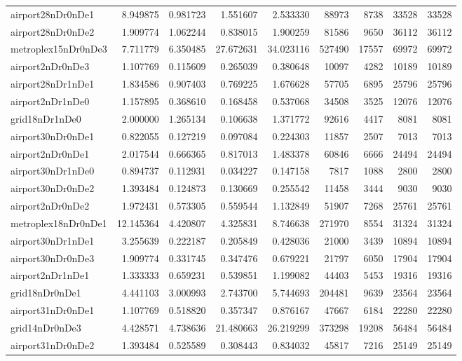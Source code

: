 \begin{longtable}{|l|r|r|r|r|r|r|r|r|}
airport28nDr0nDe1 & 8.949875 & 0.981723 & 1.551607 & 2.533330 & 88973 & 8738 & 33528 & 33528 \\
airport28nDr0nDe2 & 1.909774 & 1.062244 & 0.838015 & 1.900259 & 81586 & 9650 & 36112 & 36112 \\
metroplex15nDr0nDe3 & 7.711779 & 6.350485 & 27.672631 & 34.023116 & 527490 & 17557 & 69972 & 69972 \\
airport2nDr0nDe3 & 1.107769 & 0.115609 & 0.265039 & 0.380648 & 10097 & 4282 & 10189 & 10189 \\
airport28nDr1nDe1 & 1.834586 & 0.907403 & 0.769225 & 1.676628 & 57705 & 6895 & 25796 & 25796 \\
airport2nDr1nDe0 & 1.157895 & 0.368610 & 0.168458 & 0.537068 & 34508 & 3525 & 12076 & 12076 \\
grid18nDr1nDe0 & 2.000000 & 1.265134 & 0.106638 & 1.371772 & 92616 & 4417 & 8081 & 8081 \\
airport30nDr0nDe1 & 0.822055 & 0.127219 & 0.097084 & 0.224303 & 11857 & 2507 & 7013 & 7013 \\
airport2nDr0nDe1 & 2.017544 & 0.666365 & 0.817013 & 1.483378 & 60846 & 6666 & 24494 & 24494 \\
airport30nDr1nDe0 & 0.894737 & 0.112931 & 0.034227 & 0.147158 & 7817 & 1088 & 2800 & 2800 \\
airport30nDr0nDe2 & 1.393484 & 0.124873 & 0.130669 & 0.255542 & 11458 & 3444 & 9030 & 9030 \\
airport2nDr0nDe2 & 1.972431 & 0.573305 & 0.559544 & 1.132849 & 51907 & 7268 & 25761 & 25761 \\
metroplex18nDr0nDe1 & 12.145364 & 4.420807 & 4.325831 & 8.746638 & 271970 & 8554 & 31324 & 31324 \\
airport30nDr1nDe1 & 3.255639 & 0.222187 & 0.205849 & 0.428036 & 21000 & 3439 & 10894 & 10894 \\
airport30nDr0nDe3 & 1.909774 & 0.331745 & 0.347476 & 0.679221 & 21797 & 6050 & 17904 & 17904 \\
airport2nDr1nDe1 & 1.333333 & 0.659231 & 0.539851 & 1.199082 & 44403 & 5453 & 19316 & 19316 \\
grid18nDr0nDe1 & 4.441103 & 3.000993 & 2.743700 & 5.744693 & 204481 & 9639 & 23564 & 23564 \\
airport31nDr0nDe1 & 1.107769 & 0.518820 & 0.357347 & 0.876167 & 47667 & 6184 & 22280 & 22280 \\
grid14nDr0nDe3 & 4.428571 & 4.738636 & 21.480663 & 26.219299 & 373298 & 19208 & 56484 & 56484 \\
airport31nDr0nDe2 & 1.393484 & 0.525589 & 0.308443 & 0.834032 & 45817 & 7216 & 25149 & 25149 \\

\end{longtable}
